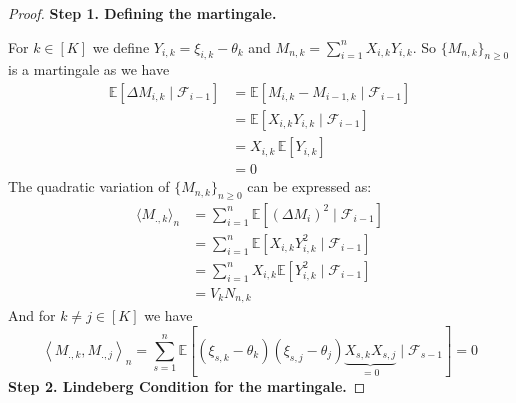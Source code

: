 \documentclass[11pt]{article}
\theoremstyle{plain}
\theoremstyle{definition}
\begin{document}
\begin{appendix}
\begin{proof}
	\textbf{Step 1. Defining the martingale.}
	
	For \(k \in [K]\) we define \( Y_{i,k} = \xi_{i,k} - \theta_k \) and \(M_{n,k} = \sum_{i=1}^{n} X_{i,k} Y_{i,k}.\) So \(\{M_{n,k}\}_{n \geq 0}\) is a martingale as we have
	\begin{align*}
		\mathbb{E}[\Delta M_{i,k} \mid \mathcal{F}_{i-1}] 
		&= \mathbb{E}[M_{i,k} - M_{i-1,k} \mid \mathcal{F}_{i-1}]\\
		&= \mathbb{E}[X_{i,k} Y_{i,k} \mid \mathcal{F}_{i-1}]\\
		&= X_{i,k} \, \mathbb{E}[Y_{i,k}]\\
		&= 0
	\end{align*}
	The quadratic variation of \( \{M_{n,k}\}_{n \geq 0} \) can be expressed as:
	\begin{align*}
		\langle M_{.,k} \rangle_n &= \sum_{i=1}^{n} \mathbb{E}\left[ (\Delta M_i)^2 \mid \mathcal{F}_{i-1} \right]\\
		&= \sum_{i=1}^{n} \mathbb{E}\left[ X_{i,k} Y_{i,k}^2 \mid \mathcal{F}_{i-1} \right]\\
		&= \sum_{i=1}^{n} X_{i,k}\mathbb{E}\left[Y_{i,k}^2 \mid \mathcal{F}_{i-1} \right]\\
		&= V_k N_{n,k}
	\end{align*}
	And for \(k \neq j \in [K]\) we have
	\[ \left<M_{.,k}, M_{.,j}\right>_n = \sum_{s=1}^{n} \mathbb{E}\left[\left(\xi_{s,k} - \theta_{k}\right)\left(\xi_{s,j} - \theta_{j}\right)\underbrace{X_{s,k}X_{s,j}}_{= 0}\mid \mathcal{F}_{s-1}\right] = 0\]	
	\textbf{Step 2. Lindeberg Condition for the martingale.}
	

\end{proof}
\end{appendix}
\end{document}
